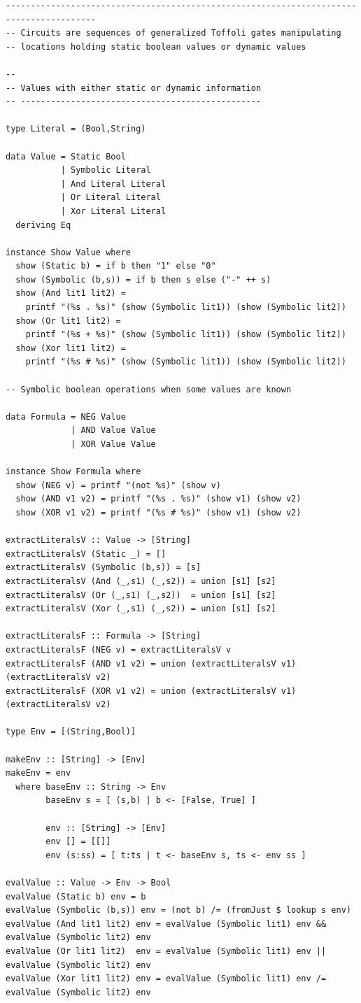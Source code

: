 \documentclass{article}
\begin{document}
\begin{verbatim}
----------------------------------------------------------------------------------------
-- Circuits are sequences of generalized Toffoli gates manipulating
-- locations holding static boolean values or dynamic values

--
-- Values with either static or dynamic information
-- ------------------------------------------------

type Literal = (Bool,String)

data Value = Static Bool
           | Symbolic Literal
           | And Literal Literal
           | Or Literal Literal
           | Xor Literal Literal
  deriving Eq

instance Show Value where
  show (Static b) = if b then "1" else "0"
  show (Symbolic (b,s)) = if b then s else ("-" ++ s)
  show (And lit1 lit2) = 
    printf "(%s . %s)" (show (Symbolic lit1)) (show (Symbolic lit2))
  show (Or lit1 lit2) = 
    printf "(%s + %s)" (show (Symbolic lit1)) (show (Symbolic lit2))
  show (Xor lit1 lit2) = 
    printf "(%s # %s)" (show (Symbolic lit1)) (show (Symbolic lit2))

-- Symbolic boolean operations when some values are known

data Formula = NEG Value
             | AND Value Value
             | XOR Value Value

instance Show Formula where
  show (NEG v) = printf "(not %s)" (show v)
  show (AND v1 v2) = printf "(%s . %s)" (show v1) (show v2)
  show (XOR v1 v2) = printf "(%s # %s)" (show v1) (show v2)

extractLiteralsV :: Value -> [String]
extractLiteralsV (Static _) = []
extractLiteralsV (Symbolic (b,s)) = [s]
extractLiteralsV (And (_,s1) (_,s2)) = union [s1] [s2]
extractLiteralsV (Or (_,s1) (_,s2))  = union [s1] [s2]
extractLiteralsV (Xor (_,s1) (_,s2)) = union [s1] [s2] 

extractLiteralsF :: Formula -> [String]
extractLiteralsF (NEG v) = extractLiteralsV v
extractLiteralsF (AND v1 v2) = union (extractLiteralsV v1) (extractLiteralsV v2)
extractLiteralsF (XOR v1 v2) = union (extractLiteralsV v1) (extractLiteralsV v2)

type Env = [(String,Bool)]

makeEnv :: [String] -> [Env]
makeEnv = env
  where baseEnv :: String -> Env
        baseEnv s = [ (s,b) | b <- [False, True] ]

        env :: [String] -> [Env]
        env [] = [[]]
        env (s:ss) = [ t:ts | t <- baseEnv s, ts <- env ss ]

evalValue :: Value -> Env -> Bool
evalValue (Static b) env = b
evalValue (Symbolic (b,s)) env = (not b) /= (fromJust $ lookup s env)
evalValue (And lit1 lit2) env = evalValue (Symbolic lit1) env && evalValue (Symbolic lit2) env
evalValue (Or lit1 lit2)  env = evalValue (Symbolic lit1) env || evalValue (Symbolic lit2) env
evalValue (Xor lit1 lit2) env = evalValue (Symbolic lit1) env /= evalValue (Symbolic lit2) env


\end{verbatim}
\end{document}
